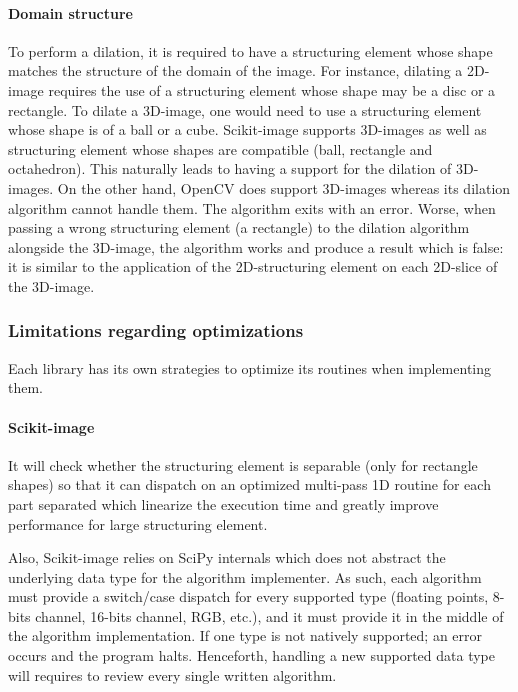 \paragraph{Domain structure} To perform a dilation, it is required to have a structuring element whose shape matches the
structure of the domain of the image. For instance, dilating a 2D-image requires the use of a structuring element whose
shape may be a disc or a rectangle. To dilate a 3D-image, one would need to use a structuring element whose shape is of
a ball or a cube. Scikit-image supports 3D-images as well as structuring element whose shapes are compatible (ball,
rectangle and octahedron). This naturally leads to having a support for the dilation of 3D-images. On the other hand,
OpenCV does support 3D-images whereas its dilation algorithm cannot handle them. The algorithm exits with an error.
Worse, when passing a wrong structuring element (a rectangle) to the dilation algorithm alongside the 3D-image, the
algorithm works and produce a result which is false: it is similar to the application of the 2D-structuring element on
each 2D-slice of the 3D-image.


\subsubsection{Limitations regarding optimizations}

Each library has its own strategies to optimize its routines when implementing them.

\paragraph{Scikit-image} It will check whether the structuring element is separable (only for rectangle shapes) so that
it can dispatch on an optimized multi-pass 1D routine for each part separated which linearize the execution time and
greatly improve performance for large structuring element.

Also, Scikit-image relies on SciPy internals which does not abstract the underlying data type for the algorithm
implementer. As such, each algorithm must provide a switch/case dispatch for every supported type (floating points,
8-bits channel, 16-bits channel, RGB, etc.), and it must provide it in the middle of the algorithm implementation. If
one type is not natively supported; an error occurs and the program halts. Henceforth, handling a new supported data
type will requires to review every single written algorithm.

